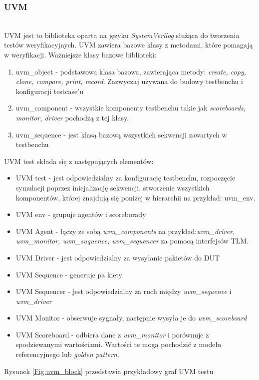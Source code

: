 \documentclass[11pt,a4paper]{article}
\begin{document}
		\subsubsection{UVM}
		\hspace{5mm}
			\\UVM jest to biblioteka oparta na języku \textit{SystemVerilog} służąca do tworzenia testów weryfikacyjnych. UVM zawiera bazowe klasy z metodami, które pomagają w weryfikacji. Ważniejsze klasy bazowe biblioteki:
			\begin{enumerate}
				\item uvm\_object - podstawowa klasa bazowa, zawierająca metody: \textit{create, copy, clone, compare, print, record}. Zazwyczaj używana do budowy testbenchu i konfiguracji testcase'u
				\item uvm\_component - wszystkie komponenty testbenchu takie jak \textit{scoreboards, monitor, driver} pochodzą z tej klasy.
				\item uvm\_sequence - jest klasą bazową wszystkich sekwencji zawartych w testbenchu
			\end{enumerate}
UVM test składa się z następujących elementów:
\begin{itemize}
	\item UVM test - jest odpowiedzialny za konfigurację testbenchu, rozpoczęcie symulacji poprzez inicjalizację sekwencji, stworzenie wszystkich komponentów, której znajdują się poniżej w hierarchii na przykład: uvm\_env.
	\item UVM env - grupuje agentów i scoreborady
	\item UVM Agent - łączy ze sobą \textit{uvm\_components} na przykład:\textit{uvm\_driver, uvm\_monitor, uvm\_suquence, uvm\_sequencer} za pomocą interfejsów TLM.
	\item UVM Driver - jest odpowiedzialny za wysyłanie pakietów do DUT
	\item UVM Sequence - generuje pa kiety
	\item UVM Sequencer - jest odpowiedzialny za ruch między \textit{uvm\_sequence} i \textit{uvm\_driver}
	\item UVM Monitor - obserwuje sygnały, następnie wysyła je do \textit{uvm\_scoreboard}
	\item UVM Scoreboard - odbiera dane z \textit{uvm\_monitor} i porównuje z spodziewanymi wartościami. Wartości te mogą pochodzić z modelu referencyjnego lub \textit{golden pattern}.
\end{itemize}
		Rysunek \ref{Fig:uvm_block} przedstawia przykładowy graf UVM testu
\end{document}
